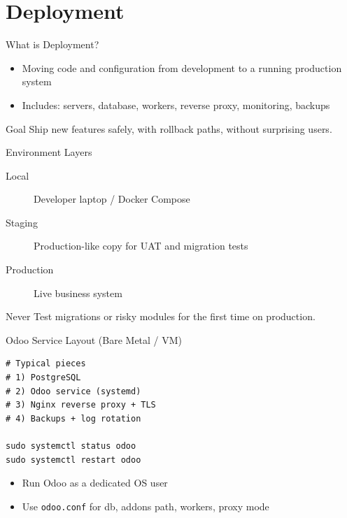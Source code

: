 \section{Deployment}

\begin{frame}{What is Deployment?}
\begin{itemize}
  \item Moving code and configuration from development to a running production system
  \item Includes: servers, database, workers, reverse proxy, monitoring, backups
\end{itemize}

\vspace{0.5em}
\begin{block}{Goal}
  Ship new features safely, with rollback paths, without surprising users.
\end{block}
\end{frame}

\begin{frame}{Environment Layers}
\begin{description}
  \item[Local] Developer laptop / Docker Compose
  \item[Staging] Production-like copy for UAT and migration tests
  \item[Production] Live business system
\end{description}

\vspace{0.6em}
\begin{alertblock}{Never}
  Test migrations or risky modules for the first time on production.
\end{alertblock}
\end{frame}

\begin{frame}[fragile]{Odoo Service Layout (Bare Metal / VM)}
\begin{lstlisting}[style=bash]
# Typical pieces
# 1) PostgreSQL
# 2) Odoo service (systemd)
# 3) Nginx reverse proxy + TLS
# 4) Backups + log rotation

sudo systemctl status odoo
sudo systemctl restart odoo
\end{lstlisting}

\vspace{0.4em}
\begin{itemize}
  \item Run Odoo as a dedicated OS user
  \item Use \texttt{odoo.conf} for db, addons path, workers, proxy mode
\end{itemize}
\end{frame}


